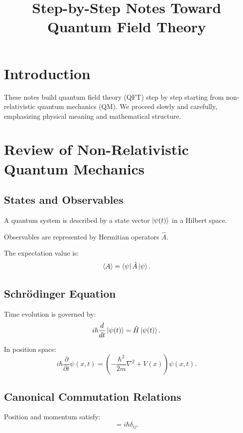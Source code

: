 \documentclass[11pt]{article}
\title{Step-by-Step Notes Toward Quantum Field Theory}
\author{}
\date{}
\begin{document}
\maketitle

\section{Introduction}
These notes build quantum field theory (QFT) step by step starting from non-relativistic quantum mechanics (QM). We proceed slowly and carefully, emphasizing physical meaning and mathematical structure.

\section{Review of Non-Relativistic Quantum Mechanics}

\subsection{States and Observables}
A quantum system is described by a state vector $\ket{\psi(t)}$ in a Hilbert space.

Observables are represented by Hermitian operators $\hat{A}$.

The expectation value is:
\begin{equation}
\langle A \rangle = \bra{\psi} \hat{A} \ket{\psi}.
\end{equation}

\subsection{Schr\"odinger Equation}
Time evolution is governed by:
\begin{equation}
i \hbar \frac{d}{dt} \ket{\psi(t)} = \hat{H} \ket{\psi(t)}.
\end{equation}

In position space:
\begin{equation}
i \hbar \frac{\partial}{\partial t} \psi(x,t) = \left(-\frac{\hbar^2}{2m} \nabla^2 + V(x)\right) \psi(x,t).
\end{equation}

\subsection{Canonical Commutation Relations}
Position and momentum satisfy:
\begin{equation}
[x_i, p_j] = i \hbar \delta_{ij}.
\end{equation}
\end{document}
